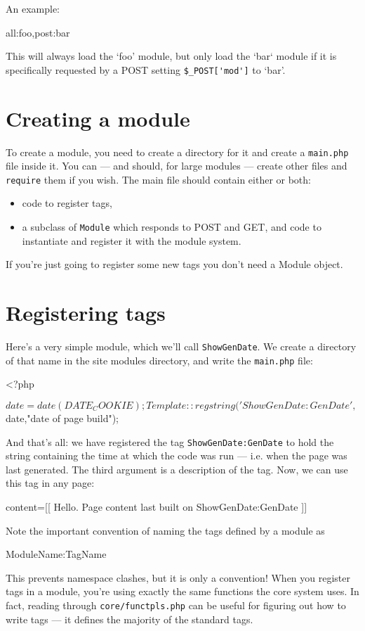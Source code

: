 \noindent An example:
\begin{MyVerbatim}
all:foo,post:bar
\end{MyVerbatim}
This will always load the `foo' module, but only load the `bar` module if it is specifically requested by a POST setting
\verb+$_POST['mod']+ to `bar'.

\section{Creating a module}
To create a module, you need to create a directory for it and 
create a \texttt{main.php} file inside it. You can --- and should, for
large modules --- create other files and \texttt{require} them if you
wish. The main file should contain either or both:
\begin{itemize}
\item code to register tags,
\item a subclass of \texttt{Module} which responds to POST and GET, and
code to instantiate and register it with the module system.
\end{itemize}
If you're just going to register some new tags you don't need a Module object.

\section{Registering tags}
Here's a very simple module, which we'll call \texttt{ShowGenDate}. We
create a directory of that name in the site modules directory, and 
write the \texttt{main.php} file:

\begin{MyVerbatim}
<?php

$date = date(DATE_COOKIE);
Template::regstring('ShowGenDate:GenDate',$date,"date of page build");

\end{MyVerbatim}

And that's all: we have registered the tag \texttt{ShowGenDate:GenDate} to hold the
string containing the time at which the code was run --- i.e. when the
page was last generated. The third argument is a description of the tag.
Now, we can use this tag in any page:
\begin{MyVerbatim}
content=[[
    Hello. Page content last built on
            {{ShowGenDate:GenDate}}
]]
\end{MyVerbatim}
Note the important convention of naming the tags defined by a module as 
\begin{MyVerbatim}
    ModuleName:TagName
\end{MyVerbatim}
This prevents namespace clashes, but it is only a convention! When you register tags
in a module, you're using exactly the same functions the core system uses. In fact, 
reading through \texttt{core/functpls.php} can be useful for figuring out how to write
tags --- it defines the majority of the standard tags.

